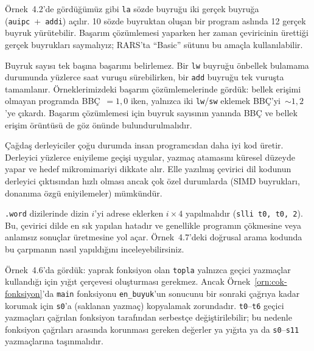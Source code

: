 Örnek~4.2'de gördüğümüz gibi \texttt{la} sözde buyruğu iki gerçek buyruğa (\texttt{auipc}~+~\texttt{addi}) açılır. 10 sözde buyruktan oluşan bir program aslında 12 gerçek buyruk yürütebilir. Başarım çözümlemesi yaparken her zaman çeviricinin ürettiği gerçek buyrukları saymalıyız; RARS'ta ``Basic'' sütunu bu amaçla kullanılabilir.


Buyruk sayısı tek başına başarımı belirlemez. Bir \texttt{lw} buyruğu önbellek bulamama durumunda yüzlerce saat vuruşu sürebilirken, bir \texttt{add} buyruğu tek vuruşta tamamlanır. Örneklerimizdeki başarım çözümlemelerinde gördük: bellek erişimi olmayan programda BBÇ~$= 1{,}0$ iken, yalnızca iki \texttt{lw}/\texttt{sw} eklemek BBÇ'yi~$\sim 1{,}2$'ye çıkardı. Başarım çözümlemesi için buyruk sayısının yanında BBÇ ve bellek erişim örüntüsü de göz önünde bulundurulmalıdır.


Çağdaş derleyiciler çoğu durumda insan programcıdan daha iyi kod üretir. Derleyici yüzlerce eniyileme geçişi uygular, yazmaç atamasını küresel düzeyde yapar ve hedef mikromimariyi dikkate alır. Elle yazılmış çevirici dil kodunun derleyici çıktısından hızlı olması ancak çok özel durumlarda (SIMD buyrukları, donanıma özgü eniyilemeler) mümkündür.


\texttt{.word} dizilerinde dizin $i$'yi adrese eklerken $i \times 4$ yapılmalıdır (\texttt{slli t0, t0, 2}). Bu, çevirici dilde en sık yapılan hatadır ve genellikle programın çökmesine veya anlamsız sonuçlar üretmesine yol açar. Örnek~4.7'deki doğrusal arama kodunda bu çarpmanın nasıl yapıldığını inceleyebilirsiniz.


Örnek~4.6'da gördük: yaprak fonksiyon olan \texttt{topla} yalnızca geçici yazmaçlar kullandığı için yığıt çerçevesi oluşturması gerekmez. Ancak Örnek~\ref{orn:cok-fonksiyon}'da \texttt{main} fonksiyonu \texttt{en\_buyuk}'un sonucunu bir sonraki çağrıya kadar korumak için \texttt{s0}'a (saklanan yazmaç) kopyalamak zorundadır. \texttt{t0}--\texttt{t6} geçici yazmaçları çağrılan fonksiyon tarafından serbestçe değiştirilebilir; bu nedenle fonksiyon çağrıları arasında korunması gereken değerler ya yığıta ya da \texttt{s0}--\texttt{s11} yazmaçlarına taşınmalıdır.

